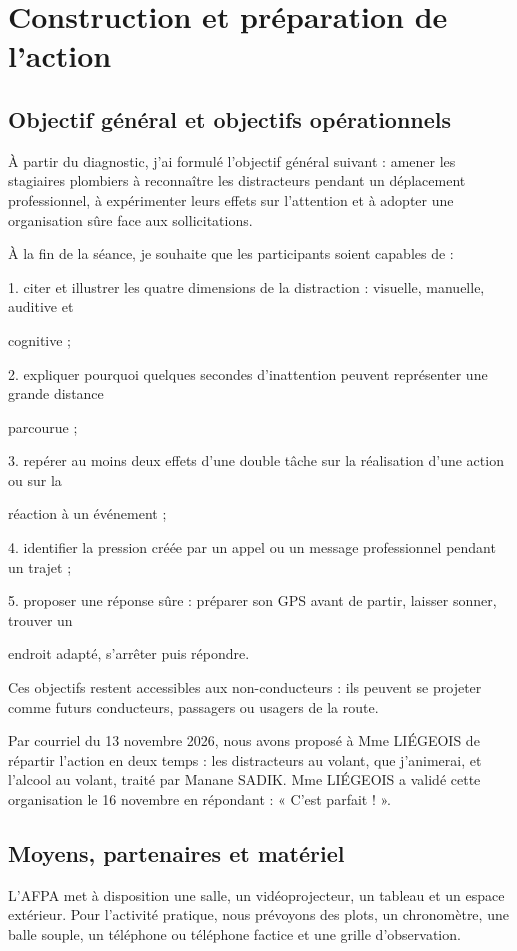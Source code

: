 \chapter{Construction et préparation de l'action}
\section{Objectif général et objectifs opérationnels}

À partir du diagnostic, j’ai formulé l’objectif général suivant : amener les stagiaires plombiers à reconnaître les distracteurs pendant un déplacement professionnel, à expérimenter leurs effets sur l’attention et à adopter une organisation sûre face aux sollicitations.

À la fin de la séance, je souhaite que les participants soient capables de :

1. citer et illustrer les quatre dimensions de la distraction : visuelle, manuelle, auditive et

cognitive ;

2. expliquer pourquoi quelques secondes d’inattention peuvent représenter une grande distance

parcourue ;

3. repérer au moins deux effets d’une double tâche sur la réalisation d’une action ou sur la

réaction à un événement ;

4. identifier la pression créée par un appel ou un message professionnel pendant un trajet ;

5. proposer une réponse sûre : préparer son GPS avant de partir, laisser sonner, trouver un

endroit adapté, s’arrêter puis répondre.

Ces objectifs restent accessibles aux non-conducteurs : ils peuvent se projeter comme futurs conducteurs, passagers ou usagers de la route.

Par courriel du 13 novembre 2026, nous avons proposé à Mme LIÉGEOIS de répartir l’action en deux temps : les distracteurs au volant, que j’animerai, et l’alcool au volant, traité par Manane SADIK. Mme LIÉGEOIS a validé cette organisation le 16 novembre en répondant : « C’est parfait ! ».


\section{Moyens, partenaires et matériel}

L’AFPA met à disposition une salle, un vidéoprojecteur, un tableau et un espace extérieur. Pour l’activité pratique, nous prévoyons des plots, un chronomètre, une balle souple, un téléphone ou téléphone factice et une grille d’observation.


